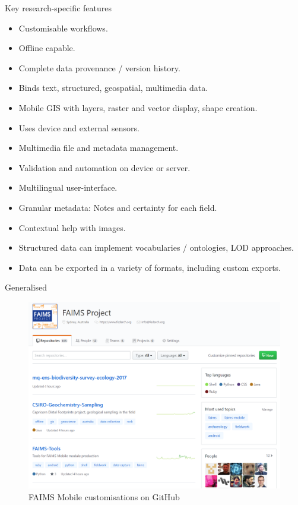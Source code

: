 \documentclass[aspectratio=169, 12pt]{beamer} %
\begin{document}
\begin{frame}{Key research-specific features}
\begin{multicols}{2}
\begin{itemize}[label=\textbullet]
        \item Customisable workflows.
        \item Offline capable.
        \item Complete data provenance / version history.
        \item Binds text, structured, geospatial, multimedia data.
        \item Mobile GIS with layers, raster and vector display, shape creation.
        \item Uses device and external sensors. 
        \item Multimedia file and metadata management.
        \item Validation and automation on device or server.
        \item Multilingual user-interface.
        \item Granular metadata: Notes and certainty for each field.
        \item Contextual help with images.
        \item Structured data can implement vocabularies / ontologies, LOD approaches.
        \item Data can be exported in a variety of formats, including custom exports.
    \end{itemize}
\end{multicols}
    
\end{frame}

\begin{frame}{Generalised}
 \begin{figure}[H]
    \centering
        \includegraphics[height=.75\textheight]{figures/FAIMS-generalised.png}
        \caption{FAIMS Mobile customisations on GitHub}
        \label{fig:FAIMS-github}
 \end{figure}
\end{frame}
\end{document}
